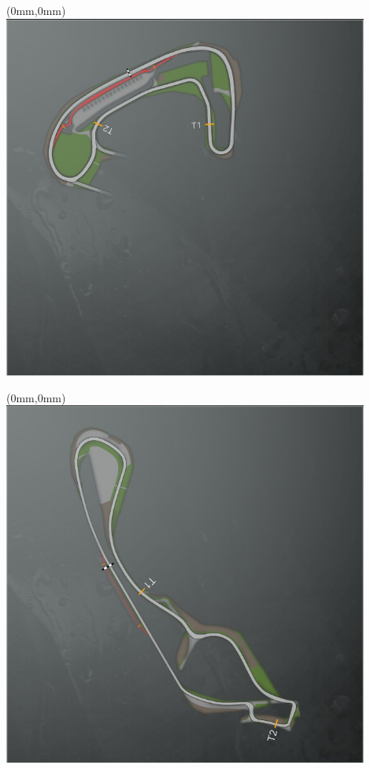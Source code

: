 \null\newpage
\begin{textblock*}{30mm}(0mm,0mm)%
\includegraphics[width=120mm]{TR/2015-05-20_00008.png}
\end{textblock*}
\null\newpage
\begin{textblock*}{30mm}(0mm,0mm)%
\includegraphics[width=120mm]{TR/2015-05-20_00055.png}
\end{textblock*}
